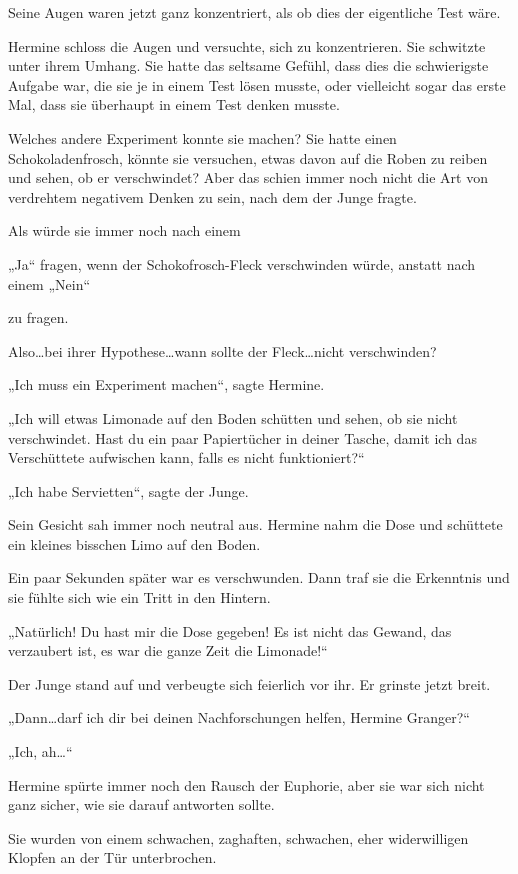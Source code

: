 {Seine Augen waren jetzt ganz konzentriert, als ob dies der eigentliche Test wäre.

Hermine schloss die Augen und versuchte, sich zu konzentrieren. Sie schwitzte unter ihrem Umhang. Sie hatte das seltsame Gefühl, dass dies die schwierigste Aufgabe war, die sie je in einem Test lösen musste, oder vielleicht sogar das erste Mal, dass sie überhaupt in einem Test denken musste.

Welches andere Experiment konnte sie machen? Sie hatte einen Schokoladenfrosch, könnte sie versuchen, etwas davon auf die Roben zu reiben und sehen, ob er verschwindet? Aber das schien immer noch nicht die Art von verdrehtem negativem Denken zu sein, nach dem der Junge fragte.

Als würde sie immer noch nach einem

„Ja“ fragen, wenn der Schokofrosch-Fleck verschwinden würde, anstatt nach einem „Nein“

zu fragen.

Also…bei ihrer Hypothese…wann sollte der Fleck…nicht verschwinden?

„Ich muss ein Experiment machen“, sagte Hermine.

„Ich will etwas Limonade auf den Boden schütten und sehen, ob sie nicht verschwindet. Hast du ein paar Papiertücher in deiner Tasche, damit ich das Verschüttete aufwischen kann, falls es nicht funktioniert?“

„Ich habe Servietten“, sagte der Junge.

Sein Gesicht sah immer noch neutral aus. Hermine nahm die Dose und schüttete ein kleines bisschen Limo auf den Boden.

Ein paar Sekunden später war es verschwunden. Dann traf sie die Erkenntnis und sie fühlte sich wie ein Tritt in den Hintern.

„Natürlich! Du hast mir die Dose gegeben! Es ist nicht das Gewand, das verzaubert ist, es war die ganze Zeit die Limonade!“

Der Junge stand auf und verbeugte sich feierlich vor ihr. Er grinste jetzt breit.

„Dann…darf ich dir bei deinen Nachforschungen helfen, Hermine Granger?“

„Ich, ah…“

Hermine spürte immer noch den Rausch der Euphorie, aber sie war sich nicht ganz sicher, wie sie darauf antworten sollte.

Sie wurden von einem schwachen, zaghaften, schwachen, eher widerwilligen Klopfen an der Tür unterbrochen.

}
